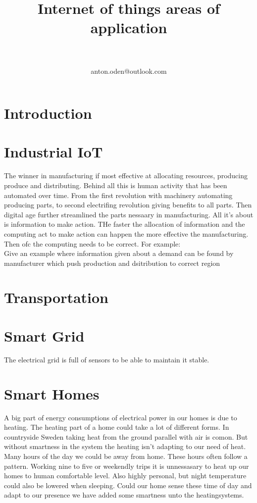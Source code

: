 \documentclass[article,a4paper]{IEEEtran}
\title{Internet of things areas of application}
\author{
\IEEEauthorblockN{Anton Odén}\\
\IEEEauthorblockA{Dept. of Maths and Computer Science\\Karlstad University\\
651 88 KARLSTAD, Sweden}\\
anton.oden@outlook.com
}
\begin{document}
\maketitle
\begin{abstract}
    \end{abstract}
    
    \section{Introduction}
    
    \section{Industrial IoT}
    The winner in manufacturing if most effective at allocating resources, producing produce and distributing. Behind all this is human activity that has been automated over time. From the first revolution with machinery automating producing parts, to second electrifing revolution giving benefits to all parts. Then digital age further streamlined the parts nessaary in manufacturing. All it's about is information to make action. THe faster the allocation of information and the computing act to make action can happen the more effective the manufacturing. Then ofc the computing needs to be correct. For example:
    \\Give an example where information given about a demand can be found by manufacturer which push production and dsitribution to correct region\\

    \section{Transportation}

    \section{Smart Grid}
    The electrical grid is full of sensors to be able to maintain it stable. 
    \section{Smart Homes}
    A big part of energy consumptions of electrical power in our homes is due to heating. The heating part of a home could take a lot of different forms. In countryside Sweden taking heat from the ground parallel with air is comon. But without smartness in the system the heating isn't adapting to our need of heat. Many hours of the day we could be away from home. These hours often follow a pattern. Working nine to five or weekendly trips it is unnessasary to heat up our homes to human comfortable level. Also highly personal, but night temperature could also be lowered when sleeping. Could our home sense these time of day and adapt to our presence we have added some smartness unto the heatingsystems. 
    
\end{document}

